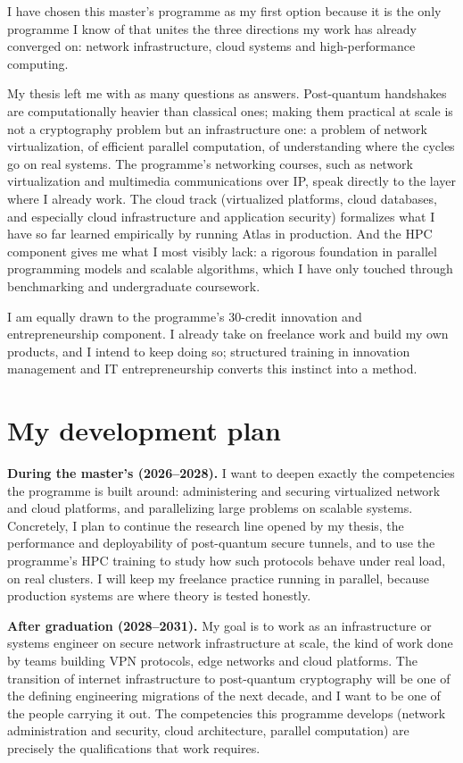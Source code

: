 \documentclass[11pt,a4paper]{article}
\begin{document}
I have chosen this master's programme as my first option because it is the only programme I know of that unites the three directions my work has already converged on: network infrastructure, cloud systems and high-performance computing.

My thesis left me with as many questions as answers. Post-quantum handshakes are computationally heavier than classical ones; making them practical at scale is not a cryptography problem but an infrastructure one: a problem of network virtualization, of efficient parallel computation, of understanding where the cycles go on real systems. The programme's networking courses, such as network virtualization and multimedia communications over IP, speak directly to the layer where I already work. The cloud track (virtualized platforms, cloud databases, and especially cloud infrastructure and application security) formalizes what I have so far learned empirically by running Atlas in production. And the HPC component gives me what I most visibly lack: a rigorous foundation in parallel programming models and scalable algorithms, which I have only touched through benchmarking and undergraduate coursework.

I am equally drawn to the programme's 30-credit innovation and entrepreneurship component. I already take on freelance work and build my own products, and I intend to keep doing so; structured training in innovation management and IT entrepreneurship converts this instinct into a method.

\section*{My development plan}

\textbf{During the master's (2026--2028).} I want to deepen exactly the competencies the programme is built around: administering and securing virtualized network and cloud platforms, and parallelizing large problems on scalable systems. Concretely, I plan to continue the research line opened by my thesis, the performance and deployability of post-quantum secure tunnels, and to use the programme's HPC training to study how such protocols behave under real load, on real clusters. I will keep my freelance practice running in parallel, because production systems are where theory is tested honestly.

\textbf{After graduation (2028--2031).} My goal is to work as an infrastructure or systems engineer on secure network infrastructure at scale, the kind of work done by teams building VPN protocols, edge networks and cloud platforms. The transition of internet infrastructure to post-quantum cryptography will be one of the defining engineering migrations of the next decade, and I want to be one of the people carrying it out. The competencies this programme develops (network administration and security, cloud architecture, parallel computation) are precisely the qualifications that work requires.
\end{document}
